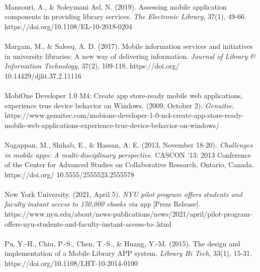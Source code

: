 \paragraph{}
Mansouri, A., & Soleymani Asl, N. (2019). Assessing mobile application components in providing library services. \textit{The Electronic Library}, 37(1), 49-66. https://doi.org/10.1108/EL-10-2018-0204

\paragraph{}
Margam, M., & Saleeq,  A. D. (2017). Mobile information services and initiatives in university libraries: A new way of delivering information. \textit{Journal of Library & Information Technology}, 37(2), 109-118. https://doi.org/ 10.14429/djlit.37.2.11116

\paragraph{}
MobiOne Developer 1.0 M4: Create app store-ready mobile web applications, experience true device behavior on Windows. (2009, October 2). \textit{Genuitec}. https://www.genuitec.com/mobione-developer-1-0-m4-create-app-store-ready-mobile-web-applications-experience-true-device-behavior-on-windows/

\paragraph{}
Nagappan, M., Shihab, E., & Hassan, A. E. (2013, November 18-20). \textit{Challenges in mobile apps: A multi-disciplinary perspective}. CASCON '13: 2013 Conference of the Center for Advanced Studies on Collaborative Research, Ontario, Canada. https://doi.org/ 10.5555/2555523.2555578

\paragraph{}
New York University. (2021, April 5). \textit{NYU pilot program offers students and faculty instant access to 150,000 ebooks via app} [Press Release]. https://www.nyu.edu/about/news-publications/news/2021/april/pilot-program-offers-nyu-students-and-faculty-instant-access-to-.html

\paragraph{}
Pu, Y.-H., Chiu, P.-S., Chen, T.-S., & Huang, Y.-M. (2015). The design and implementation of a Mobile Library APP system. \textit{Library Hi Tech}, 33(1), 15-31. https://doi.org/10.1108/LHT-10-2014-0100

